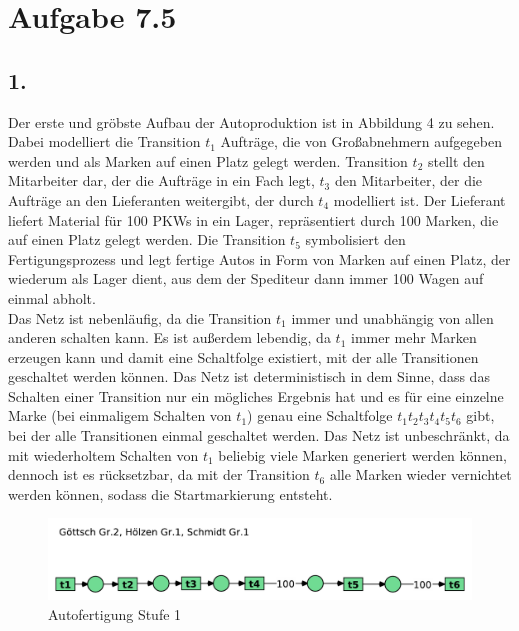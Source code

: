 \documentclass[12pt, paper=a4]{article}
\begin{document}
\newpage
\section*{Aufgabe 7.5}
\subsection*{1.}
Der erste und gröbste Aufbau der Autoproduktion ist in Abbildung 4 zu sehen. Dabei modelliert die Transition $t_1$ Aufträge, die von Großabnehmern aufgegeben werden und als Marken auf einen Platz gelegt werden. Transition $t_2$ stellt den Mitarbeiter dar, der die Aufträge in ein Fach legt, $t_3$ den Mitarbeiter, der die Aufträge an den Lieferanten weitergibt, der durch $t_4$ modelliert ist. Der Lieferant liefert Material für 100 PKWs in ein Lager, repräsentiert durch 100 Marken, die auf einen Platz gelegt werden. Die Transition $t_5$ symbolisiert den Fertigungsprozess und legt fertige Autos in Form von Marken auf einen Platz, der wiederum als Lager dient, aus dem der Spediteur dann immer 100 Wagen auf einmal abholt.\\

Das Netz ist nebenläufig, da die Transition $t_1$ immer und unabhängig von allen anderen schalten kann. Es ist außerdem lebendig, da $t_1$ immer mehr Marken erzeugen kann und damit eine Schaltfolge existiert, mit der alle Transitionen geschaltet werden können. Das Netz ist deterministisch in dem Sinne, dass das Schalten einer Transition nur ein mögliches Ergebnis hat und es für eine einzelne Marke (bei einmaligem Schalten von $t_1$) genau eine Schaltfolge $t_1t_2t_3t_4t_5t_6$ gibt, bei der alle Transitionen einmal geschaltet werden. Das Netz ist unbeschränkt, da mit wiederholtem Schalten von $t_1$ beliebig viele Marken generiert werden können, dennoch ist es rücksetzbar, da mit der Transition $t_6$ alle Marken wieder vernichtet werden können, sodass die Startmarkierung entsteht.\\

\begin{figure}[h!]
\centering
\includegraphics[scale=0.7]{7-5-1.pdf}
\caption{Autofertigung Stufe 1}
\end{figure}
\end{document}
